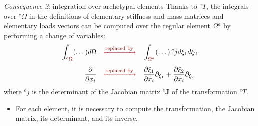 \documentclass[aspectratio=169]{beamer}
\begin{document}
{  \begin{frame}{\emph{Consequence 2}: integration over archetypal elements}
      Thanks to ${}^eT$, the integrals over ${}^e\Omega$ in the definitions of elementary stiffness and mass matrices and elementary loads vectors can be computed over the regular element $\Omega{}^a$ by performing a change of variables:
      \begin{align*}
          \int_{{\color{darkred}{}^e\Omega}}(\dots)d\Omega & \quad{\color{darkred}\xmapsto[]{\text{replaced by}}}\quad\int_{{\color{darkred}\Omega{}^a}}(\dots)\, {}^ej d\xi_1d\xi_2                                         \\[5pt]
          \frac{\partial}{\partial x_i}                    & \quad{\color{darkred}\xmapsto[]{\text{replaced by}}}\quad\frac{\partial\xi_1}{\partial x_i}\partial_{\xi_1}+ \frac{\partial\xi_2}{\partial x_i}\partial_{\xi_2}
      \end{align*}
      where ${}^ej$ is the determinant of the Jacobian matrix ${}^e\mathbf J$ of the transformation ${}^eT$.
      \vspace{0.2cm}
      \begin{tcolorbox}[colback=darkred!10,colframe=darkred!40!black,]
          \begin{itemize}
              \item[\HandRight] \small For each element, it is necessary to compute the transformation, the Jacobian matrix, its determinant, and its inverse.
          \end{itemize}
      \end{tcolorbox}
  \end{frame}

}
\end{document}
